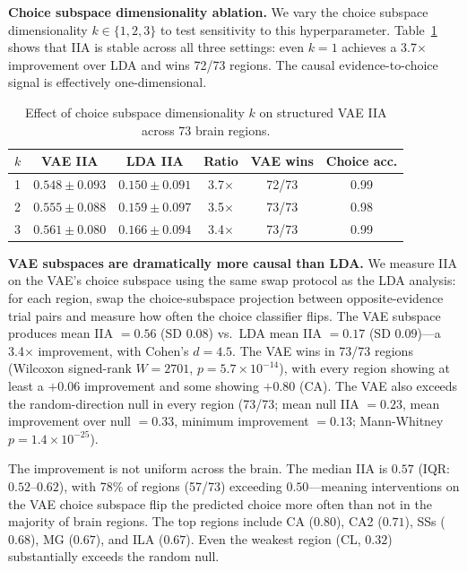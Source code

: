 \documentclass{article}
\begin{document}
\textbf{Choice subspace dimensionality ablation.} We vary the choice subspace dimensionality $k \in \{1, 2, 3\}$ to test sensitivity to this hyperparameter. Table~\ref{tab:vae_k_ablation} shows that IIA is stable across all three settings: even $k = 1$ achieves a 3.7$\times$ improvement over LDA and wins 72/73 regions. The causal evidence-to-choice signal is effectively one-dimensional.

\begin{table}[h]
\centering
\small
\caption{Effect of choice subspace dimensionality $k$ on structured VAE IIA across 73 brain regions.}
\label{tab:vae_k_ablation}
\begin{tabular}{lccccc}
\toprule
$k$ & VAE IIA & LDA IIA & Ratio & VAE wins & Choice acc. \\
\midrule
1 & $0.548 \pm 0.093$ & $0.150 \pm 0.091$ & 3.7$\times$ & 72/73 & 0.99 \\
2 & $0.555 \pm 0.088$ & $0.159 \pm 0.097$ & 3.5$\times$ & 73/73 & 0.98 \\
3 & $0.561 \pm 0.080$ & $0.166 \pm 0.094$ & 3.4$\times$ & 73/73 & 0.99 \\
\bottomrule
\end{tabular}
\end{table}

\textbf{VAE subspaces are dramatically more causal than LDA.} We measure IIA on the VAE's choice subspace using the same swap protocol as the LDA analysis: for each region, swap the choice-subspace projection between opposite-evidence trial pairs and measure how often the choice classifier flips. The VAE subspace produces mean IIA $= 0.56$ (SD $0.08$) vs.\ LDA mean IIA $= 0.17$ (SD $0.09$)---a 3.4$\times$ improvement, with Cohen's $d = 4.5$. The VAE wins in 73/73 regions (Wilcoxon signed-rank $W = 2701$, $p = 5.7 \times 10^{-14}$), with every region showing at least a $+0.06$ improvement and some showing $+0.80$ (CA). The VAE also exceeds the random-direction null in every region (73/73; mean null IIA $= 0.23$, mean improvement over null $= 0.33$, minimum improvement $= 0.13$; Mann-Whitney $p = 1.4 \times 10^{-25}$).

The improvement is not uniform across the brain. The median IIA is $0.57$ (IQR: $0.52$--$0.62$), with 78\% of regions (57/73) exceeding $0.50$---meaning interventions on the VAE choice subspace flip the predicted choice more often than not in the majority of brain regions. The top regions include CA ($0.80$), CA2 ($0.71$), SSs ($0.68$), MG ($0.67$), and ILA ($0.67$). Even the weakest region (CL, $0.32$) substantially exceeds the random null.
\end{document}
